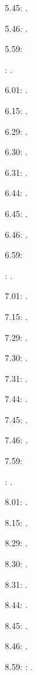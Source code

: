 \label{key}\documentclass[italian]{article}
\begin{document}
5.45:   .

5.46:   .

5.59:   

:  .

6.01:   . 

6.15:   . 

6.29:   . 

6.30:   .

6.31:   .

6.44:   .

6.45:   .

6.46:   .

6.59:   

:  .

7.01:   . 

7.15:   . 

7.29:   . 

7.30:   .

7.31:   .

7.44:   .

7.45:   .

7.46:   .

7.59:   

:  .

8.01:   . 

8.15:   . 

8.29:   . 

8.30:   .

8.31:   .

8.44:   .

8.45:   .

8.46:   .

8.59:   
:  .
\end{document}
